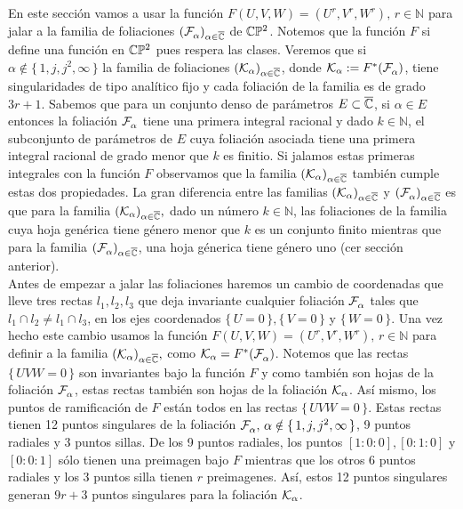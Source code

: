 En este sección vamos a usar la función $F(U,V,W)=(U^{r},V^{r},W^{r}),\, r\in\mathbb{N}$ para jalar a la familia de foliaciones $(\mathcal{F}^{\ }_{\alpha})_{\alpha\in\overline{\mathbb{C}}}$ de $\mathbb{C}\mathbb{P}^2$. Notemos que la función $F$ si define una función en $\mathbb{C}\mathbb{P}^2$ pues respera las clases. Veremos que si $\alpha\notin\{\, 1,j,j^{2},\infty\, \}$ la familia de foliaciones $(\mathcal{K}_{\alpha})_{\alpha\in\overline{\mathbb{C}}}$, donde $\mathcal{K}_{\alpha}:=F^{*}(\mathcal{F}^{\ }_{\alpha})$, tiene singularidades de tipo analítico fijo y cada foliación de la familia es de grado $3r+1$. Sabemos que para un conjunto denso de parámetros $E\subset\overline{\mathbb{C}}$, si $\alpha\in E$ entonces la foliación $\mathcal{F}^{\ }_{\alpha}$ tiene una primera integral racional y dado $k\in\mathbb{N}$, el subconjunto de parámetros de $E$ cuya foliación asociada tiene una primera integral racional de grado menor que $k$ es finitio. Si jalamos estas primeras integrales con la función $F$ observamos que la familia $(\mathcal{K}_{\alpha})_{\alpha\in\overline{\mathbb{C}}}$ también cumple estas dos propiedades. La gran diferencia entre las familias $(\mathcal{K}_{\alpha})_{\alpha\in\overline{\mathbb{C}}}$ y $(\mathcal{F}^{\ }_{\alpha})_{\alpha\in\overline{\mathbb{C}}}$ es que para la familia $(\mathcal{K}_{\alpha})_{\alpha\in\overline{\mathbb{C}}},$ dado un número $k\in\mathbb{N}$, las foliaciones de la familia cuya hoja genérica tiene género menor que $k$ es un conjunto finito mientras que para la familia $(\mathcal{F}^{\ }_{\alpha})_{\alpha\in\overline{\mathbb{C}}}$, una hoja génerica tiene género uno (cer sección anterior).\\

Antes de empezar a jalar las foliaciones haremos un cambio de coordenadas que lleve tres rectas $\mathit{l}_{1},\mathit{l}_{2},\mathit{l}_{3}$ que deja invariante cualquier foliación $\mathcal{F}^{\ }_{\alpha}$ tales que $\mathit{l}_{1}\cap\mathit{l}_{2}\neq\mathit{l}_{1}\cap\mathit{l}_{3}$, en los ejes coordenados $\{\,  U=0\, \},\{\, V=0 \, \}$ y $\{\, W=0 \, \}$. Una vez hecho este cambio usamos la función $F(U,V,W)=(U^{r},V^{r},W^{r}),\, r\in\mathbb{N}$ para definir a la familia $(\mathcal{K}_{\alpha})_{\alpha\in\overline{\mathbb{C}}},$ como $\mathcal{K}_{\alpha}=F^{*}(\mathcal{F}^{\ }_{\alpha})$. Notemos que las rectas $\{\,  UVW=0\,\}$ son invariantes bajo la función $F$ y como también son hojas de la foliación $\mathcal{F}^{\ }_{\alpha}$, estas rectas también son hojas de la foliación $\mathcal{K}_{\alpha}$. Así mismo, los puntos de ramificación de $F$ están todos en las rectas $\{\,  UVW=0\,\}$. Estas rectas tienen 12 puntos singulares de la foliación $\mathcal{F}^{\ }_{\alpha},\, \alpha\notin\{\, 1,j,j^{2},\infty\, \}$, 9 puntos radiales y 3 puntos sillas. De los 9 puntos radiales, los puntos $[1:0:0],[0:1:0]$ y $[0:0:1]$ sólo tienen una preimagen bajo $F$ mientras que los otros 6 puntos radiales y los 3 puntos silla tienen $r$ preimagenes. Así, estos 12 puntos singulares generan $9r+3$ puntos singulares para la foliación $\mathcal{K}_{\alpha}$.

